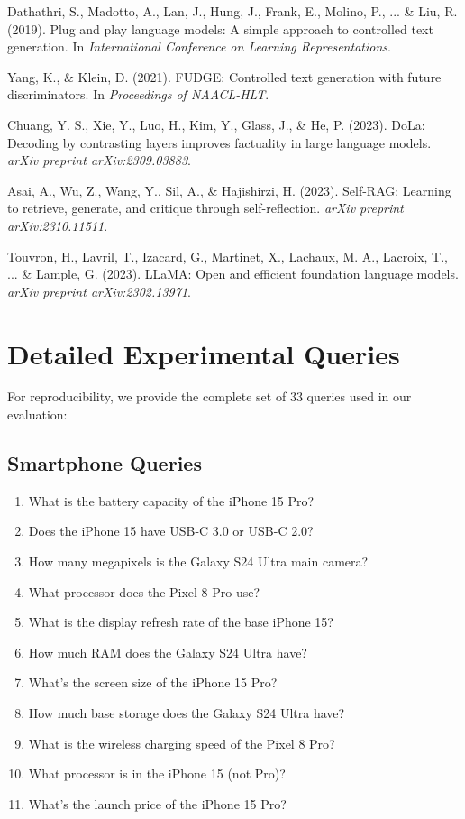 \documentclass[11pt, a4paper]{article}
\theoremstyle{definition}
\begin{document}
\begin{thebibliography}{99}
Dathathri, S., Madotto, A., Lan, J., Hung, J., Frank, E., Molino, P., ... \& Liu, R. (2019). 
Plug and play language models: A simple approach to controlled text generation. 
In \textit{International Conference on Learning Representations}.

Yang, K., \& Klein, D. (2021). 
FUDGE: Controlled text generation with future discriminators. 
In \textit{Proceedings of NAACL-HLT}.

Chuang, Y. S., Xie, Y., Luo, H., Kim, Y., Glass, J., \& He, P. (2023). 
DoLa: Decoding by contrasting layers improves factuality in large language models. 
\textit{arXiv preprint arXiv:2309.03883}.

Asai, A., Wu, Z., Wang, Y., Sil, A., \& Hajishirzi, H. (2023). 
Self-RAG: Learning to retrieve, generate, and critique through self-reflection. 
\textit{arXiv preprint arXiv:2310.11511}.

Touvron, H., Lavril, T., Izacard, G., Martinet, X., Lachaux, M. A., Lacroix, T., ... \& Lample, G. (2023). 
LLaMA: Open and efficient foundation language models. 
\textit{arXiv preprint arXiv:2302.13971}.

\end{thebibliography}

\appendix

\section{Detailed Experimental Queries}

For reproducibility, we provide the complete set of 33 queries used in our evaluation:

\subsection{Smartphone Queries}
\begin{enumerate}
    \item What is the battery capacity of the iPhone 15 Pro?
    \item Does the iPhone 15 have USB-C 3.0 or USB-C 2.0?
    \item How many megapixels is the Galaxy S24 Ultra main camera?
    \item What processor does the Pixel 8 Pro use?
    \item What is the display refresh rate of the base iPhone 15?
    \item How much RAM does the Galaxy S24 Ultra have?
    \item What's the screen size of the iPhone 15 Pro?
    \item How much base storage does the Galaxy S24 Ultra have?
    \item What is the wireless charging speed of the Pixel 8 Pro?
    \item What processor is in the iPhone 15 (not Pro)?
    \item What's the launch price of the iPhone 15 Pro?
\end{enumerate}
\end{document}
